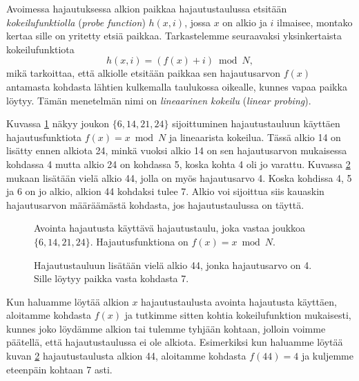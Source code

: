 
Avoimessa hajautuksessa alkion paikkaa hajautustaulussa etsitään
\emph{kokeilufunktiolla} (\emph{probe function})
$h(x,i)$, jossa $x$ on alkio ja $i$ ilmaisee, montako kertaa
sille on yritetty etsiä paikkaa.
Tarkastelemme seuraavaksi yksinkertaista kokeilufunktiota
\[ h(x,i) = (f(x)+i) \bmod N,\]
mikä tarkoittaa, että alkiolle etsitään paikkaa sen
hajautusarvon $f(x)$ antamasta kohdasta lähtien kulkemalla taulukossa oikealle,
kunnes vapaa paikka löytyy.
Tämän menetelmän nimi on \emph{lineaarinen kokeilu}
(\emph{linear probing}).

Kuvassa \ref{fig:hajavo} näkyy joukon $\{6,14,21,24\}$
sijoittuminen hajautustauluun
käyttäen hajautusfunktiota $f(x)=x \bmod N$ ja lineaarista kokeilua.
Tässä alkio 14 on lisätty ennen alkiota 24,
minkä vuoksi alkio 14 on sen hajautusarvon mukaisessa kohdassa 4
mutta alkio 24 on kohdassa 5, koska kohta 4 oli jo varattu.
Kuvassa \ref{fig:hajav2} mukaan lisätään vielä alkio 44,
jolla on myös hajautusarvo 4.
Koska kohdissa 4, 5 ja 6 on jo alkio, alkion 44 kohdaksi tulee 7.
Alkio voi sijoittua siis kauaskin hajautusarvon määräämästä kohdasta,
jos hajautustaulussa on täyttä.

\begin{figure}
\center
{}
\caption{Avointa hajautusta käyttävä hajautustaulu, joka vastaa joukkoa $\{6,14,21,24\}$.
Hajautusfunktiona on $f(x)=x \bmod N$.}
\label{fig:hajavo}
\end{figure}

\begin{figure}
\center
{}
\caption{Hajautustauluun lisätään vielä alkio 44, jonka hajautusarvo on 4.
Sille löytyy paikka vasta kohdasta 7.}
\label{fig:hajav2}
\end{figure}

Kun haluamme löytää alkion $x$ hajautustaulusta avointa hajautusta käyt\-täen,
aloitamme kohdasta $f(x)$ ja tutkimme sitten kohtia kokeilufunktion mukaisesti,
kunnes joko löydämme alkion tai tulemme tyhjään kohtaan, jolloin voimme päätellä,
että hajautustaulussa ei ole alkiota.
Esimerkiksi kun haluamme löytää kuvan \ref{fig:hajav2} hajautustaulusta
alkion 44, aloitamme kohdasta $f(44)=4$ ja kuljemme eteenpäin kohtaan 7 asti.

